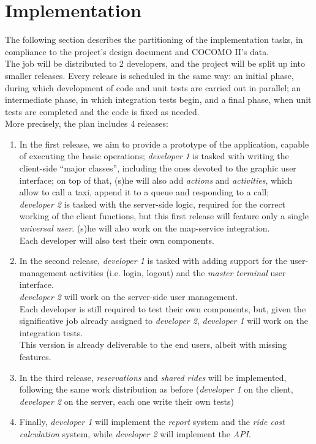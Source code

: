 \section{Implementation}
The following section describes the partitioning of the implementation tasks, in compliance to
the project's design document and COCOMO II's data. \\
The job will be distributed to 2 developers, and the project will be split up into
smaller releases.
Every release is scheduled in the same way: an initial phase, during which development of code and unit tests
are carried out in parallel; an intermediate phase, in which integration tests begin, and a final phase, when
unit tests are completed and the code is fixed as needed. \\
More precisely, the plan includes 4 releases:
\begin{enumerate}
 \item In the first release, we aim to provide a prototype of the application, capable of executing the basic operations;
 \textit{developer 1} is tasked with writing the client-side ``major classes'', including the ones devoted to the graphic
 user interface; on top of that, (s)he will also add \textit{actions} and \textit{activities}, which allow to call a taxi,
 append it to a queue and responding to a call; \\
 \textit{developer 2} is tasked with the server-side logic, required for the correct working of the client functions,
 but this first release will feature only a single \textit{universal user}. (s)he will also work on the map-service
 integration. \\
 Each developer will also test their own components.
 \item In the second release, \textit{developer 1} is tasked with adding support for the user-management activities
 (i.e. login, logout) and the \textit{master terminal} user interface. \\
 \textit{developer 2} will work on the server-side user management. \\
 Each developer is still required to test their own components, but, given the significative job already assigned to
 \textit{developer 2}, \textit{developer 1} will work on the integration tests. \\
 This version is already deliverable to the end users, albeit with missing features.
 \item In the third release, \textit{reservations} and \textit{shared rides} will be implemented, following the
 same work distribution as before (\textit{developer 1} on the client, \textit{developer 2} on the server, each one
 write their own tests)
 \item Finally, \textit{developer 1} will implement the \textit{report} system and the \textit{ride cost calculation} system,
 while \textit{developer 2} will implement the \textit{API}.
\end{enumerate}


